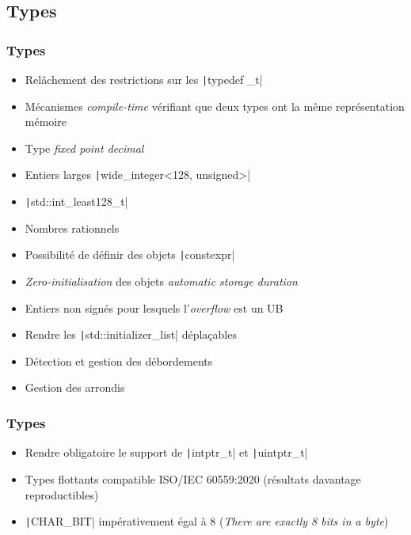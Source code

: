 \documentclass[C++.tex]{subfiles}
\begin{document}
\subsection*{Types}
\begin{frame}[fragile]
	\frametitle{Types}
	\begin{itemize}
		\item Relâchement des restrictions sur les \texttt|typedef _t|
		\item Mécanismes \textit{compile-time} vérifiant que deux types ont la même représentation mémoire
		\item Type \og{}\textit{fixed point decimal}\fg{}
		\item Entiers larges \texttt|wide_integer<128, unsigned>|
		\item \texttt|std::int_least128_t|
		\item Nombres rationnels
		\item Possibilité de définir des objets \texttt|constexpr|
		\item \textit{Zero-initialisation} des objets \textit{automatic storage duration}
		\item Entiers non signés pour lesquels l'\textit{overflow} est un UB
		\item Rendre les \texttt|std::initializer_list| déplaçables
		\item Détection et gestion des débordements
		\item Gestion des arrondis
	\end{itemize}

\end{frame}

\begin{frame}[fragile]
	\frametitle{Types}
	\begin{itemize}
		\item Rendre obligatoire le support de \texttt|intptr_t| et \texttt|uintptr_t|
		\item Types flottants compatible ISO/IEC 60559:2020 (résultats davantage reproductibles)
		\item \texttt|CHAR_BIT| impérativement égal à 8 (\textit{\og{}There are exactly 8 bits in a byte\fg{}})

	\end{itemize}

\end{frame}
\end{document}
